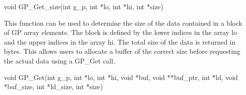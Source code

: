 \documentclass[12pt]{article}
\begin{document}


\begin{capi}
\begin{ccode}
void GP_Get_size(int g_p, int *lo, int *hi, int *size)
\end{ccode}
\begin{funcargs}
\end{funcargs}
\end{capi}

\ncoll

\begin{desc}

This function can be used to determine the size of the data contained in a block
of GP array elements. The block is defined by the lower indices in the array lo
and the upper indices in the array hi. The total size of the data is returned in
bytes. This allows users to allocate a buffer of the correct size before
requesting the actual data using a GP\_Get call.

\end{desc}



\begin{capi}
\begin{ccode}
void GP_Get(int g_p, int *lo, int *hi, void *buf, void **buf_ptr, int *ld,
             void *buf_size, int *ld_size, int *size)
\end{ccode}
\begin{funcargs}
\end{funcargs}
\end{capi}

\ncoll
\end{document}
